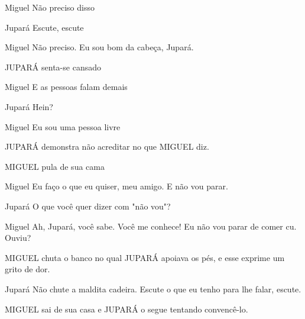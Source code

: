 \documentclass{screenplay}
\begin{document}
\begin{dialogue}{Miguel}
    Não preciso disso
\end{dialogue}

\begin{dialogue}{Jupará}
    Escute, escute
\end{dialogue}

\begin{dialogue}{Miguel}
    Não preciso. Eu sou bom da cabeça, Jupará.
\end{dialogue}

JUPARÁ senta-se cansado

\begin{dialogue}{Miguel}
    E as pessoas falam demais
\end{dialogue}

\begin{dialogue}{Jupará}
    Hein?
\end{dialogue}

\begin{dialogue}{Miguel}
    Eu sou uma pessoa livre
\end{dialogue}

JUPARÁ demonstra não acreditar no que MIGUEL diz.

MIGUEL pula de sua cama

\begin{dialogue}{Miguel}
    Eu faço o que eu quiser, meu amigo. E não vou parar.
\end{dialogue}

\begin{dialogue}{Jupará}
    O que você quer dizer com "não vou"?
\end{dialogue}

\begin{dialogue}{Miguel}
    Ah, Jupará, você sabe. Você me conhece!
    Eu não vou parar de comer cu. Ouviu?
\end{dialogue}

MIGUEL chuta o banco no qual JUPARÁ apoiava os pés, e esse exprime um grito de dor.

\begin{dialogue}{Jupará}
    Não chute a maldita cadeira. Escute o que eu tenho para lhe falar, escute.
\end{dialogue}

MIGUEL sai de sua casa e JUPARÁ o segue tentando convencê-lo.

\end{document}
